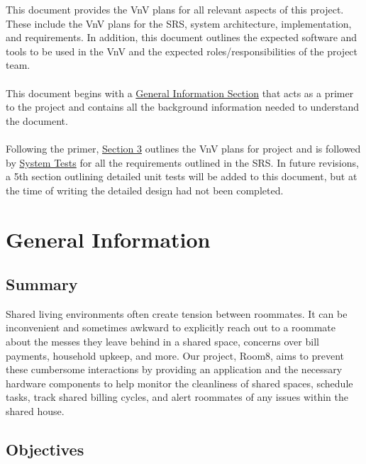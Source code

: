 \documentclass[12pt, titlepage]{article}
\begin{document}
This document provides the VnV plans for all relevant aspects of this project. These include the VnV plans for the SRS, system architecture, implementation, and requirements. In addition, this document outlines the expected software and tools to be used in the VnV and the expected roles/responsibilities of the project team. \\\\This document begins with a 
\hyperref[sec:generalInfo]{General Information Section} that acts as a primer to the project and contains all the background information needed to understand the document.\\\\Following the primer, \hyperref[section:JustPlan]{Section 3} outlines the VnV plans for project and is followed by \hyperref[section:systemTests]{System Tests} for all the requirements outlined in the SRS. In future revisions, a 5th section outlining detailed unit tests will be added to this document, but at the time of writing the detailed design had not been completed.

\section{General Information}
\label{sec:generalInfo}
\subsection{Summary}

Shared living environments often create tension between roommates. It can be inconvenient and sometimes awkward to explicitly reach out to a roommate about the messes they leave behind in a shared space, concerns over bill payments, household upkeep, and more. Our project, Room8,
aims to prevent these cumbersome interactions by providing an application and the
necessary hardware components to help monitor the cleanliness of shared spaces,
schedule tasks, track shared billing cycles, and alert roommates of any issues within the shared house.

\subsection{Objectives}
\end{document}
